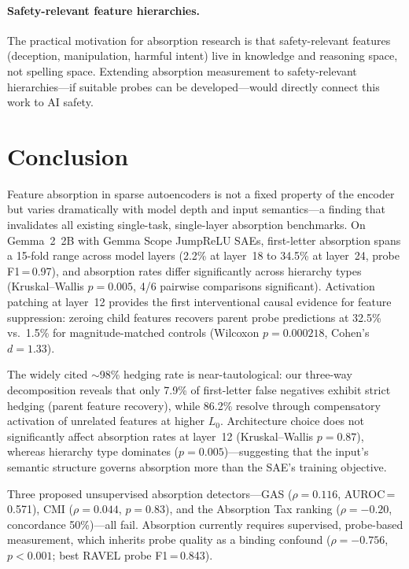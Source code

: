 \documentclass{article}
\begin{document}
\paragraph{Safety-relevant feature hierarchies.} The practical motivation for absorption research is that safety-relevant features (deception, manipulation, harmful intent) live in knowledge and reasoning space, not spelling space. Extending absorption measurement to safety-relevant hierarchies---if suitable probes can be developed---would directly connect this work to AI safety.

\section{Conclusion}
\label{sec:conclusion}

Feature absorption in sparse autoencoders is not a fixed property of the encoder but varies dramatically with model depth and input semantics---a finding that invalidates all existing single-task, single-layer absorption benchmarks. On Gemma~2~2B with Gemma Scope JumpReLU SAEs, first-letter absorption spans a 15-fold range across model layers (2.2\% at layer~18 to 34.5\% at layer~24, probe F1\,=\,0.97), and absorption rates differ significantly across hierarchy types (Kruskal--Wallis $p = 0.005$, 4/6 pairwise comparisons significant). Activation patching at layer~12 provides the first interventional causal evidence for feature suppression: zeroing child features recovers parent probe predictions at 32.5\% vs.\ 1.5\% for magnitude-matched controls (Wilcoxon $p = 0.000218$, Cohen's $d = 1.33$).

The widely cited ${\sim}$98\% hedging rate is near-tautological: our three-way decomposition reveals that only 7.9\% of first-letter false negatives exhibit strict hedging (parent feature recovery), while 86.2\% resolve through compensatory activation of unrelated features at higher $L_0$. Architecture choice does not significantly affect absorption rates at layer~12 (Kruskal--Wallis $p = 0.87$), whereas hierarchy type dominates ($p = 0.005$)---suggesting that the input's semantic structure governs absorption more than the SAE's training objective.

Three proposed unsupervised absorption detectors---GAS ($\rho = 0.116$, AUROC\,=\,0.571), CMI ($\rho = 0.044$, $p = 0.83$), and the Absorption Tax ranking ($\rho = -0.20$, concordance 50\%)---all fail. Absorption currently requires supervised, probe-based measurement, which inherits probe quality as a binding confound ($\rho = -0.756$, $p < 0.001$; best RAVEL probe F1\,=\,0.843).
\end{document}
